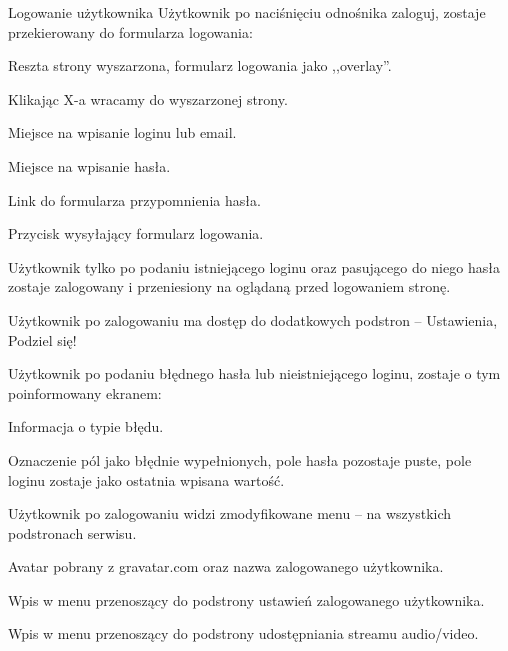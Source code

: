 \begin{userstory}{Logowanie użytkownika}
    Użytkownik po naciśnięciu odnośnika zaloguj,
    zostaje przekierowany do formularza logowania:
    \begin{packed_enum}
        \item Reszta strony wyszarzona, formularz logowania jako ,,overlay''.
        \item Klikając X-a wracamy do wyszarzonej strony.
        \item Miejsce na wpisanie loginu lub email.
        \item Miejsce na wpisanie hasła.
        \item Link do formularza przypomnienia hasła.
        \item Przycisk wysyłający formularz logowania.
    \end{packed_enum}
    
    \begin{tests}
        \item{
            Użytkownik tylko po podaniu istniejącego loginu oraz pasującego do niego hasła
            zostaje zalogowany i przeniesiony na oglądaną przed logowaniem stronę.
        }
        \item{
            Użytkownik po zalogowaniu ma dostęp do dodatkowych podstron -- Ustawienia, Podziel się!
        }
        \item{
            Użytkownik po podaniu błędnego hasła lub nieistniejącego loginu, zostaje o tym poinformowany ekranem:
            \begin{packed_enum}
                \item Informacja o typie błędu.
                \item Oznaczenie pól jako błędnie wypełnionych, pole hasła pozostaje puste, pole loginu zostaje jako ostatnia wpisana wartość.
            \end{packed_enum}
        }
        \item{
            Użytkownik po zalogowaniu widzi zmodyfikowane menu -- na wszystkich podstronach serwisu.
            \begin{packed_enum}
                \item Avatar pobrany z gravatar.com oraz nazwa zalogowanego użytkownika.
                \item Wpis w menu przenoszący do podstrony ustawień zalogowanego użytkownika.
                \item Wpis w menu przenoszący do podstrony udostępniania streamu audio/video.
            \end{packed_enum}
        }
    \end{tests}
\end{userstory}

